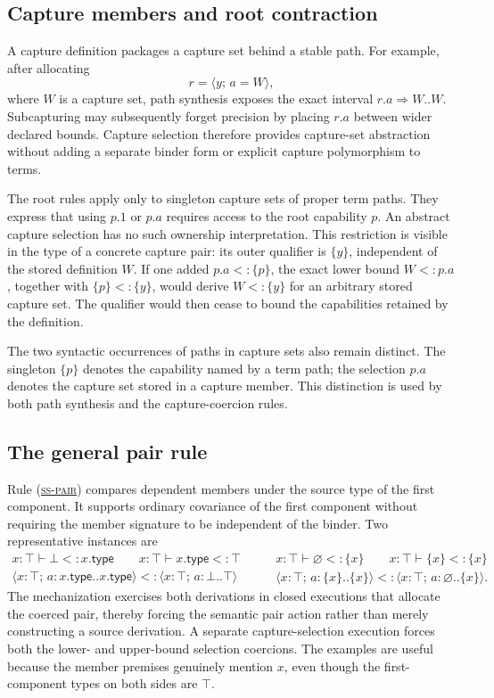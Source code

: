 \documentclass[acmsmall,screen,nonacm]{acmart}
\newcommand{\ruleref}[1]{%
  \textsc{(\hyperref[rule:#1]{#1})}}
\newcommand{\cempty}{\varnothing}
\newcommand{\cset}[1]{\{#1\}}
\newcommand{\sing}[1]{#1.\mathsf{type}}
\newcommand{\pairshape}[4]{\langle #1\!:\!#2;\,#3\!:\!#4\rangle}
\newcommand{\pairval}[3]{\langle #1;\,#2=#3\rangle}
\begin{document}
\subsection{Capture members and root contraction}

A capture definition packages a capture set behind a stable path.  For
example, after allocating
\[
  r=\pairval{y}{a}{W},
\]
where \(W\) is a capture set, path synthesis exposes the exact interval
\(r.a\Rightarrow W..W\).  Subcapturing may subsequently forget precision by
placing \(r.a\) between wider declared bounds.  Capture selection therefore
provides capture-set abstraction without adding a separate binder form or
explicit capture polymorphism to terms.

The root rules apply only to singleton capture sets of proper term paths.
They express that using \(p.1\) or \(p.a\) requires access to the root
capability \(p\).  An abstract capture selection has no such ownership
interpretation.  This restriction is visible in the type of a concrete
capture pair: its outer qualifier is \(\cset y\), independent of the stored
definition \(W\).  If one added \(p.a<:\cset p\), the exact lower bound
\(W<:p.a\), together with \(\cset p<:\cset y\), would derive
\(W<:\cset y\) for an arbitrary stored capture set.  The qualifier would
then cease to bound the capabilities retained by the definition.

The two syntactic occurrences of paths in capture sets also remain distinct.
The singleton \(\cset p\) denotes the capability named by a term path; the
selection \(p.a\) denotes the capture set stored in a capture member.  This
distinction is used by both path synthesis and the capture-coercion rules.

\subsection{The general pair rule}

Rule \ruleref{ss-pair} compares dependent members under the source type of
the first component.  It supports ordinary covariance of the first component
without requiring the member signature to be independent of the binder.  Two
representative instances are
\[
\begin{array}{c}
 x:\top\vdash \bot<:\sing x
 \qquad
 x:\top\vdash \sing x<:\top
 \\[-1pt]
 \hline
 \pairshape{x}{\top}{a}{\sing x..\sing x}
 <: \pairshape{x}{\top}{a}{\bot..\top}
\end{array}
\qquad
\begin{array}{c}
 x:\top\vdash \cempty<:\cset x
 \qquad
 x:\top\vdash \cset x<:\cset x
 \\[-1pt]
 \hline
 \pairshape{x}{\top}{a}{\cset x..\cset x}
 <: \pairshape{x}{\top}{a}{\cempty..\cset x}.
\end{array}
\]
The mechanization exercises both derivations in closed executions that
allocate the coerced pair, thereby forcing the semantic pair action rather
than merely constructing a source derivation.  A separate capture-selection
execution forces both the lower- and upper-bound selection coercions.  The
examples are useful because the member premises genuinely mention \(x\), even
though the first-component types on both sides are \(\top\).
\end{document}
